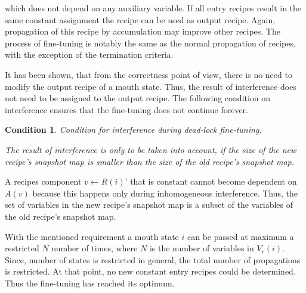 \documentclass[12pt,a4paper]{scrartcl}
\newtheorem{condition}{Condition}
\begin{document}
which does not depend on any auxiliary variable. If all entry recipes result in
the same constant assignment the recipe can be used as output recipe. Again,
propagation of this recipe by accumulation may improve other recipes. The process
of fine-tuning is notably the same as the normal propagation of recipes, with 
the exception of the termination criteria.

It has been shown, that from the correctness point of view, there is no need to
modify the output recipe of a mouth state. Thus, the result of interference
does not need to be assigned to the output recipe. The following condition 
on interference ensures that the fine-tuning does not continue forever.

\begin{condition}
Condition for interference during dead-lock fine-tuning.

The result of interference is only to be taken into account, if the size of the
new recipe's snapshot map is smaller than the size of the old recipe's snapshot
map.  
\end{condition}

A recipes component $v \leftarrow R(i)$' that is constant cannot become dependent on
$A(v)$ because this happens only during inhomogeneous interference. Thus, the
set of variables in the new recipe's snapshot map is a subset of the variables
of the old recipe's snapshot map.

With the mentioned requirement a mouth state $i$ can be passed at maximum a
restricted $N$ number of times, where $N$ is the number of variables in
$V_r(i)$. Since, number of states is restricted in general, the total number of
propagations is restricted. At that point, no new constant entry recipes could
be determined. Thus the fine-tuning has reached its optimum.
\end{document}
